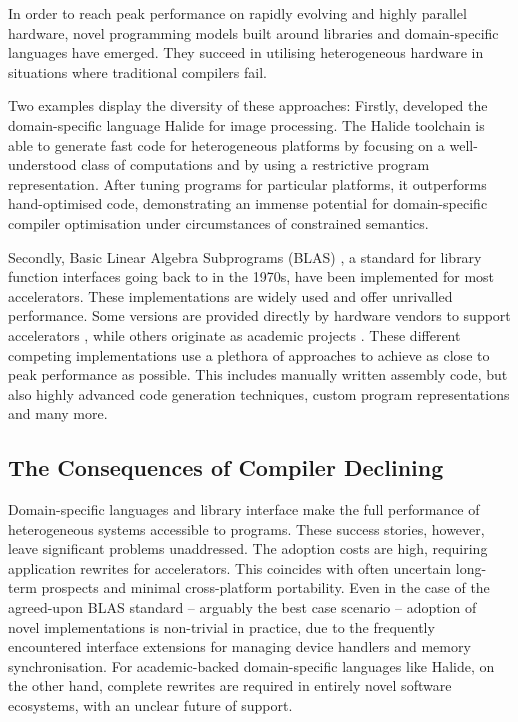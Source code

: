     In order to reach peak performance on rapidly evolving and highly parallel
    hardware, novel programming models built around libraries and
    domain-specific languages have emerged.
    They succeed in utilising heterogeneous hardware in situations where
    traditional compilers fail.

    Two examples display the diversity of these approaches:
    Firstly, \citet{Ragan-Kelley2013Halide} developed the domain-specific
    language Halide for image processing.
    The Halide toolchain is able to generate fast code for heterogeneous
    platforms by focusing on a well-understood class of computations and by
    using a restrictive program representation.
    After tuning programs for particular platforms, it outperforms
    hand-optimised code, demonstrating an immense potential for domain-specific
    compiler optimisation under circumstances of constrained semantics.

    Secondly, Basic Linear Algebra Subprograms (BLAS)
    \citep{2002:USB:567806.567807}, a standard for library function interfaces
    going back to \citet{Lawson:1979:BLA:355841.355847} in the 1970s, have been
    implemented for most accelerators.
    These implementations are widely used and offer unrivalled performance.
    Some versions are provided directly by hardware vendors to support
    accelerators \citep{mkl,cublas,clblas,apl,qml}, while others originate as
    academic projects \citep{Wang:2013:AAG:2503210.2503219}.
    These different competing implementations use a plethora of approaches to achieve as
    close to peak performance as possible.
    This includes manually written assembly code, but also highly advanced
    code generation techniques, custom program representations and many more.

\subsection{The Consequences of Compiler Declining}

    Domain-specific languages and library interface make the full performance of
    heterogeneous systems accessible to programs.
    These success stories, however, leave significant problems unaddressed.
    The adoption costs are high, requiring application rewrites for
    accelerators.
    This coincides with often uncertain long-term prospects and minimal
    cross-platform portability.
    Even in the case of the agreed-upon BLAS standard -- arguably the best case
    scenario -- adoption of novel implementations is non-trivial in practice,
    due to the frequently encountered interface extensions for managing device
    handlers and memory synchronisation.
    For academic-backed domain-specific languages like Halide, on the other
    hand, complete rewrites are required in entirely novel software ecosystems,
    with an unclear future of support.

